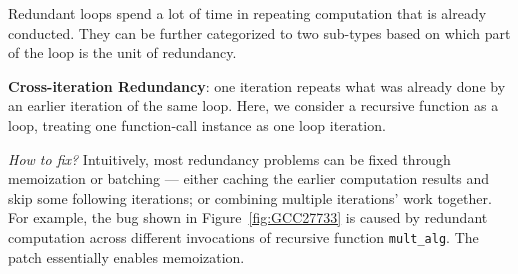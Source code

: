Redundant loops spend a lot of time in repeating computation that is already
conducted. They can be further categorized to two sub-types
based on which part of the loop is the unit of redundancy.




{\textbf{Cross-iteration Redundancy}}:
one iteration repeats
what was already done by an earlier iteration of the same loop.
Here, we consider a recursive function as a loop, treating one function-call
instance as one loop iteration. 

{\textit{How to fix?}}
Intuitively, most redundancy problems can be fixed through memoization or
batching --- either caching the earlier computation results and skip
some following iterations; or combining multiple iterations' work
together.
For example, the bug shown in Figure~\ref{fig:GCC27733} is caused by
redundant computation across different invocations of recursive function
\texttt{mult\_alg}. The patch essentially enables memoization.

